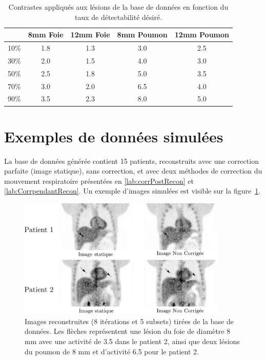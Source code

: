 \begin{table}

\centering

\begin{tabular}{|c||c|c||c|c|}
 \hline
	& 8mm Foie	& 12mm Foie	& 8mm Poumon	& 12mm Poumon	\\
\hline
10\%	& 1.8		& 1.3		& 3.0		& 2.5		\\
\hline
30\%	& 2.0		& 1.5		& 4.0		& 3.0		\\
\hline
50\%	& 2.5		& 1.8		& 5.0		& 3.5		\\
\hline
70\%	& 3.0		& 2.0		& 6.5		& 4.0		\\
\hline
90\%	& 3.5		& 2.3		& 8.0		& 5.0		\\
\hline
\end{tabular}
\caption[Contraste final lésions du foie et du poumon]{Contrastes appliqués aux lésions de la base de données en fonction du taux de détectabilité désiré.}
\label{tab:contrasteFoieFinal}
\end{table}



\section{Exemples de données simulées}

La base de données générée contient 15 patients, reconstruits avec une correction parfaite (image statique), sans correction, et avec deux méthodes de correction du mouvement respiratoire présentées en \ref{lab:corrPostRecon} et \ref{lab:CorrpendantRecon}. Un exemple d'images simulées est visible sur la figure~\ref{fig:exempleImageRecon}.

\begin{figure}
 \centering
 \includegraphics[width=10cm]{images/exempleImageRecon}
 \caption[Images reconstruites tirées de la base de donnée]{Images reconstruites (8 itérations et 5 subsets) tirées de la base de données. Les flèches représentent une lésion du foie de diamètre 8 mm avec une activité de 3.5 dans le patient 2, ainsi que deux lésions du poumon de 8 mm et d'activité 6.5 pour le patient 2.}
 \label{fig:exempleImageRecon}
\end{figure}



